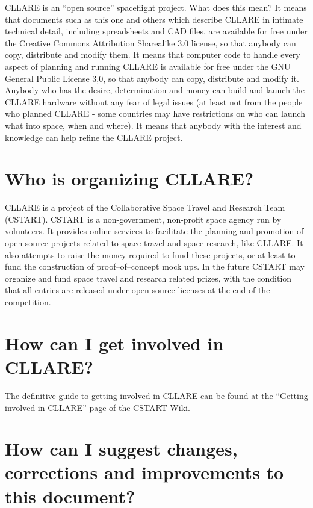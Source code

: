 \documentclass{report}
\begin{document}
CLLARE is an ``open source'' spaceflight project.  What does this mean?  It means that documents such as this one and others which describe CLLARE in intimate technical detail, including spreadsheets and CAD files, are available for free under the Creative Commons Attribution Sharealike 3.0 license, so that anybody can copy, distribute and modify them.  It means that computer code to handle every aspect of planning and running CLLARE is available for free under the GNU General Public License 3,0, so that anybody can copy, distribute and modify it.  Anybody who has the desire, determination and money can build and launch the CLLARE hardware without any fear of legal issues (at least not from the people who planned CLLARE - some countries may have restrictions on who can launch what into space, when and where).  It means that anybody with the interest and knowledge can help refine the CLLARE project.

\section{Who is organizing CLLARE?}

CLLARE is a project of the Collaborative Space Travel and Research Team (CSTART).  CSTART is a non-government, non-profit space agency run by volunteers.  It provides online services to facilitate the planning and promotion of open source projects related to space travel and space research, like CLLARE.  It also attempts to raise the money required to fund these projects, or at least to fund the construction of proof--of--concept mock ups.  In the future CSTART may organize and fund space travel and research related prizes, with the condition that all entries are released under open source licenses at the end of the competition.

\section{How can I get involved in CLLARE?}

The definitive guide to getting involved in CLLARE can be found at the ``\href{http://cstart.org/wiki/Getting_involved_in_CLLARE}{Getting involved in CLLARE}'' page of the CSTART Wiki.

\section{How can I suggest changes, corrections and improvements to this document?}
\end{document}
